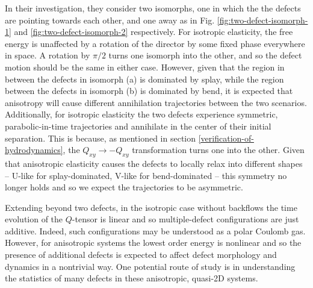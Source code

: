 \documentclass[reqno]{article}
\begin{document}
  In their investigation, they consider two isomorphs, one in which the the
  defects are pointing towards each other, and one away as in Fig.
  \ref{fig:two-defect-isomorph-1} and \ref{fig:two-defect-isomorph-2} respectively.
  For isotropic elasticity, the free energy is unaffected by a rotation of the
  director by some fixed phase everywhere in space.
  A rotation by $\pi / 2$ turns one isomorph into the other, and so the defect
  motion should be the same in either case.
  However, given that the region in between the defects in isomorph (a) is dominated by splay,
  while the region between the defects in isomorph (b) is dominated by bend, it
  is expected that anisotropy will cause different annihilation trajectories
  between the two scenarios.
  Additionally, for isotropic elasticity the two defects experience symmetric,
  parabolic-in-time trajectories and annihilate in the center of their initial
  separation.
  This is because, as mentioned in section \ref{verification-of-hydrodynamics}, the $Q_{xy} \to -Q_{xy}$ transformation
  turns one into the other.
  Given that anisotropic elasticity causes the defects to locally relax into
  different shapes -- U-like for splay-dominated, V-like for bend-dominated --
  this symmetry no longer holds and so we expect the trajectories to be
  asymmetric.

  Extending beyond two defects, in the isotropic case without backflows the
  time evolution of the $Q$-tensor is linear and so multiple-defect
  configurations are just additive.
  Indeed, such configurations may be understood as a polar Coulomb gas.
  However, for anisotropic systems the lowest order energy is nonlinear and so
  the presence of additional defects is expected to affect defect morphology and
  dynamics in a nontrivial way.
  One potential route of study is in understanding the statistics of many
  defects in these anisotropic, quasi-2D systems.
\end{document}
